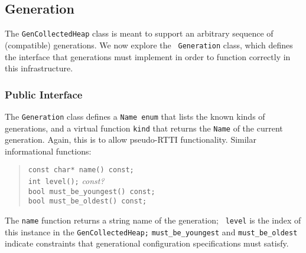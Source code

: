 \documentclass{article}
\begin{document}
\subsection{Generation}
\label{gen:generation}

The {\tt GenCollectedHeap} class is meant to support an arbitrary
sequence of (compatible) generations.  We now explore the {\tt
Generation} class, which defines the interface that generations must
implement in order to function correctly in this infrastructure.

\subsubsection{Public Interface}

The {\tt Generation} class defines a {\tt Name enum} that lists the
known kinds of generations, and a virtual function {\tt kind} that
returns the {\tt Name} of the current generation.  Again, this is to
allow pseudo-RTTI functionality.  Similar informational functions:
\begin{quote}
    {\tt const char* name() const;} \\
    {\tt int level();}  {\em const?} \\
    {\tt bool must\_be\_youngest() const;} \\
    {\tt bool must\_be\_oldest() const;}
\end{quote}
The {\tt name} function returns a string name of the generation; {\tt
level} is the index of this instance in the {\tt GenCollectedHeap;}
{\tt must\_be\_youngest} and {\tt must\_be\_oldest} indicate constraints
that generational configuration specifications must satisfy.
\end{document}
